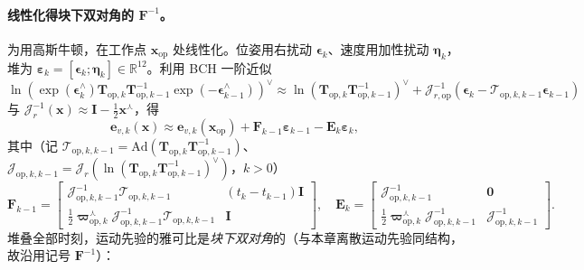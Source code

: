 \paragraph{线性化得块下双对角的 $\mathbf{F}^{-1}$。}
为用高斯牛顿，在工作点 $\mathbf{x}_{\mathrm{op}}$ 处线性化。位姿用右扰动 $\boldsymbol{\epsilon}_k$、速度用加性扰动 $\boldsymbol{\eta}_k$，堆为 $\boldsymbol{\varepsilon}_k=[\boldsymbol{\epsilon}_k;\boldsymbol{\eta}_k]\in\mathbb{R}^{12}$。利用 BCH 一阶近似 $\ln(\exp(\boldsymbol{\epsilon}_k^\wedge)\mathbf{T}_{\mathrm{op},k}\mathbf{T}_{\mathrm{op},k-1}^{-1}\exp(-\boldsymbol{\epsilon}_{k-1}^\wedge))^\vee\approx\ln(\mathbf{T}_{\mathrm{op},k}\mathbf{T}_{\mathrm{op},k-1}^{-1})^\vee+\boldsymbol{\mathcal{J}}_{r,\mathrm{op}}^{-1}(\boldsymbol{\epsilon}_k-\boldsymbol{\mathcal{T}}_{\mathrm{op},k,k-1}\boldsymbol{\epsilon}_{k-1})$ 与 $\boldsymbol{\mathcal{J}}_r^{-1}(\mathbf{x})\approx\mathbf{I}-\tfrac12\mathbf{x}^\curlywedge$，得
\begin{equation}
  \mathbf{e}_{v,k}(\mathbf{x})\approx\mathbf{e}_{v,k}(\mathbf{x}_{\mathrm{op}})+\mathbf{F}_{k-1}\boldsymbol{\varepsilon}_{k-1}-\mathbf{E}_k\boldsymbol{\varepsilon}_k,
  \label{eq:steam-lin}
\end{equation}
其中（记 $\boldsymbol{\mathcal{T}}_{\mathrm{op},k,k-1}=\mathrm{Ad}(\mathbf{T}_{\mathrm{op},k}\mathbf{T}_{\mathrm{op},k-1}^{-1})$、$\boldsymbol{\mathcal{J}}_{\mathrm{op},k,k-1}=\boldsymbol{\mathcal{J}}_r(\ln(\mathbf{T}_{\mathrm{op},k}\mathbf{T}_{\mathrm{op},k-1}^{-1})^\vee)$，$k>0$）
\begin{equation}
  \mathbf{F}_{k-1}=\begin{bmatrix}\boldsymbol{\mathcal{J}}_{\mathrm{op},k,k-1}^{-1}\boldsymbol{\mathcal{T}}_{\mathrm{op},k,k-1}&(t_k-t_{k-1})\mathbf{I}\\[2pt]\tfrac12\boldsymbol{\varpi}_{\mathrm{op},k}^\curlywedge\boldsymbol{\mathcal{J}}_{\mathrm{op},k,k-1}^{-1}\boldsymbol{\mathcal{T}}_{\mathrm{op},k,k-1}&\mathbf{I}\end{bmatrix},\quad
  \mathbf{E}_k=\begin{bmatrix}\boldsymbol{\mathcal{J}}_{\mathrm{op},k,k-1}^{-1}&\mathbf{0}\\[2pt]\tfrac12\boldsymbol{\varpi}_{\mathrm{op},k}^\curlywedge\boldsymbol{\mathcal{J}}_{\mathrm{op},k,k-1}^{-1}&\boldsymbol{\mathcal{J}}_{\mathrm{op},k,k-1}^{-1}\end{bmatrix}.
  \label{eq:steam-FE}
\end{equation}
堆叠全部时刻，运动先验的雅可比是\emph{块下双对角}的（与本章离散运动先验同结构，故沿用记号 $\mathbf{F}^{-1}$）：
